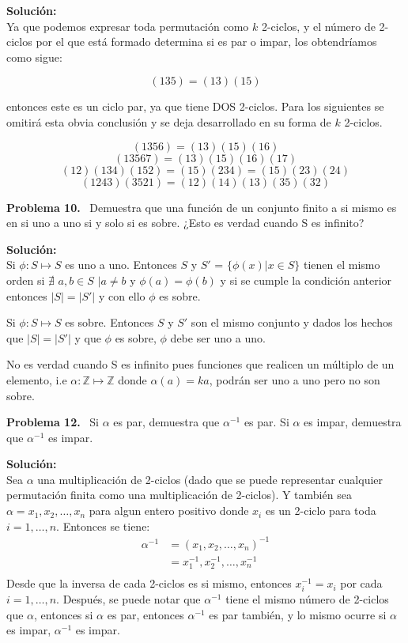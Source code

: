 \documentclass{article}
\newcounter{problem}
\newcounter{solution}
\newcommand\Problem[1]{%
  \stepcounter{problem}%
  \textbf{Problema #1.}~%
  \setcounter{solution}{0}%
}
\newcommand\TheSolution{%
  \textbf{Solución:}\\%
}
\begin{document}
\TheSolution{}
Ya que podemos expresar toda permutación como $k$ 2-ciclos, y el número de
2-ciclos por el que está formado determina si es par o impar, los obtendríamos
como sigue:

\[
  (135)=(13)(15)
\]

entonces este es un ciclo par, ya que tiene DOS 2-ciclos. Para los siguientes
se omitirá esta obvia conclusión y se deja desarrollado en su forma de $k$
2-ciclos.

\[{(1356)} = {(13)}{(15)}{(16)}\]
\[(13567) = (13)(15)(16)(17)\]
\[(12)(134)(152) = (15)(234)=(15)(23)(24)\]
\[(1243)(3521) = (12)(14)(13)(35)(32)\]

\Problem{10} Demuestra que una función de un conjunto finito a si mismo es en
si uno a uno si y solo si es sobre. ¿Esto es verdad cuando S es infinito?

\TheSolution{}
Si $\phi : S \mapsto S$ es uno a uno. Entonces $S$ y $S'$ = $\{\phi
(x) | x \in S\}$ tienen el mismo orden si $\nexists$ $a,b \in S$ $\mid a \neq
b$ y $\phi (a) = \phi (b)$ y si se cumple la condici\'on anterior entonces 
$|S| = |S'|$ y con ello $\phi$ es sobre.

Si $\phi : S \mapsto S$ es sobre. Entonces $S$ y $S'$ son el mismo
conjunto y dados los hechos que $|S| = |S'|$ y que $\phi$ es sobre,
$\phi$ debe ser uno a uno.

No es verdad cuando S es infinito pues funciones que realicen un múltiplo de
un elemento, i.e $\alpha : \mathbb{Z} \mapsto \mathbb{Z}$ donde $\alpha (a) =
ka$, podrán ser uno a uno pero no son sobre.

\Problem{12} Si $\alpha$ es par, demuestra que $\alpha^{-1}$ es par. Si
$\alpha$ es impar, demuestra que $\alpha^{-1}$ es impar.

\TheSolution{}
Sea $\alpha$ una multiplicación de 2-ciclos (dado que se puede representar
cualquier permutaci\'on finita como una multiplicación de 2-ciclos). Y también
sea $\alpha = x_1,x_2,\dots,x_n$ para algun entero positivo donde $x_i$ es un
2-ciclo para toda $i=1,\dots,n$. Entonces se tiene:\\
		\begin{align*}
      \alpha^{-1} &= {(x_1,x_2,\dots,x_n)}^{-1}\\
			&= x_1^{-1}, x_2^{-1},\dots,x_n^{-1}\\
		\end{align*}
Desde que la inversa de cada 2-ciclos es si mismo, entonces $x_i^{-1} = x_i$
por cada $i=1,\dots,n$. Despu\'es, se puede notar que $\alpha^{-1}$ tiene el
mismo n\'umero de 2-ciclos que $\alpha$, entonces si $\alpha$ es par, entonces
$\alpha^{-1}$ es par tambi\'en, y lo mismo ocurre si $\alpha$ es impar,
$\alpha^{-1}$ es impar.
\end{document}
